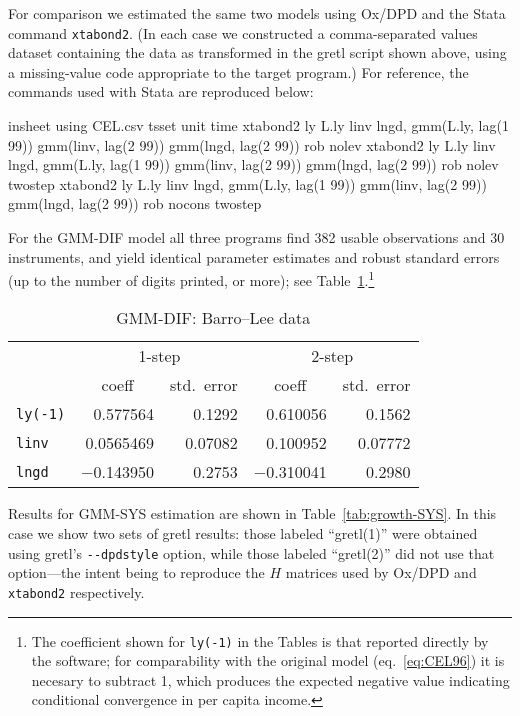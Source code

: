 For comparison we estimated the same two models using Ox/DPD and the
Stata command \texttt{xtabond2}. (In each case we constructed a
comma-separated values dataset containing the data as transformed in
the gretl script shown above, using a missing-value code appropriate
to the target program.) For reference, the commands used with
Stata are reproduced below:
%
\begin{code}
insheet using CEL.csv
tsset unit time
xtabond2 ly L.ly linv lngd, gmm(L.ly, lag(1 99)) gmm(linv, lag(2 99)) 
  gmm(lngd, lag(2 99)) rob nolev
xtabond2 ly L.ly linv lngd, gmm(L.ly, lag(1 99)) gmm(linv, lag(2 99)) 
  gmm(lngd, lag(2 99)) rob nolev twostep
xtabond2 ly L.ly linv lngd, gmm(L.ly, lag(1 99)) gmm(linv, lag(2 99)) 
  gmm(lngd, lag(2 99)) rob nocons twostep
\end{code}

For the GMM-DIF model all three programs find 382 usable observations
and 30 instruments, and yield identical parameter estimates and
robust standard errors (up to the number of digits printed, or more);
see Table~\ref{tab:growth-DIF}.\footnote{The coefficient shown for
  \texttt{ly(-1)} in the Tables is that reported directly by the
  software; for comparability with the original model (eq.\
  \ref{eq:CEL96}) it is necesary to subtract 1, which produces the
  expected negative value indicating conditional convergence in per
  capita income.}

\begin{table}[htbp]
\begin{center}
\begin{tabular}{lrrrr}
& \multicolumn{2}{c}{1-step} & \multicolumn{2}{c}{2-step} \\
& \multicolumn{1}{c}{coeff} & \multicolumn{1}{c}{std.\ error} &
  \multicolumn{1}{c}{coeff} & \multicolumn{1}{c}{std.\ error} \\
\texttt{ly(-1)} & 0.577564 & 0.1292 & 0.610056 & 0.1562 \\
\texttt{linv} & 0.0565469 & 0.07082 & 0.100952 & 0.07772 \\
\texttt{lngd} & $-$0.143950 & 0.2753 & $-$0.310041 & 0.2980 \\
\end{tabular}
\caption{GMM-DIF: Barro--Lee data}
\label{tab:growth-DIF}
\end{center}
\end{table}

Results for GMM-SYS estimation are shown in
Table~\ref{tab:growth-SYS}. In this case we show two sets of gretl
results: those labeled ``gretl(1)'' were obtained using gretl's
\verb|--dpdstyle| option, while those labeled ``gretl(2)'' did not use
that option---the intent being to reproduce the $H$ matrices used by
Ox/DPD and \texttt{xtabond2} respectively.

